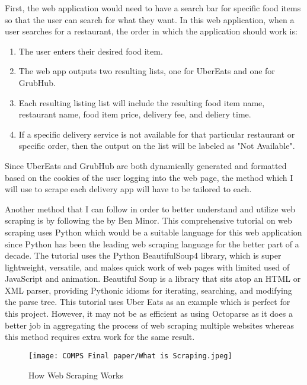 \documentclass[10pt,twocolumn]{article}
\begin{document}
First, the web application would need to have a search bar for specific food items so that the user can search for what they want. In this web application, when a user searches for a restaurant, the order in which the application should work is:

\begin{enumerate}[label=(\Alph*)]
\item The user enters their desired food item.
\item The web app outputs two resulting lists, one for UberEats and one for GrubHub.
\item Each resulting listing list will include the resulting food item name, restaurant name, food item price, delivery fee, and deliery time.
\item If a specific delivery service is not available for that particular restaurant or specific order, then the output on the list will be labeled as "Not Available".
\end{enumerate}

Since UberEats and GrubHub are both dynamically generated and formatted based on the cookies of the user logging into the web page, the method which I will use to scrape each delivery app will have to be tailored to each.

Another method that I can follow in order to better understand and utilize web scraping is by following the  by Ben Minor. This comprehensive tutorial on web scraping uses Python which would be a suitable language for this web application since Python has been the leading web scraping language for the better part of a decade. The tutorial uses the Python BeautifulSoup4 library, which is super lightweight, versatile, and makes quick work of web pages with limited used of JavaScript and animation. Beautiful Soup is a library that sits atop an HTML or XML parser, providing Pythonic idioms for iterating, searching, and modifying the parse tree. This tutorial uses Uber Eats as an example which is perfect for this project. However, it may not be as efficient as using Octoparse as it does a better job in aggregating the process of web scraping multiple websites whereas this method requires extra work for the same result.

\begin{figure}
    \centering
    \texttt{[image: COMPS Final paper/What is Scraping.jpeg]}
    \caption{
        How Web Scraping Works
    }
    \label{fig:second-page-4}
\end{figure}
\end{document}
